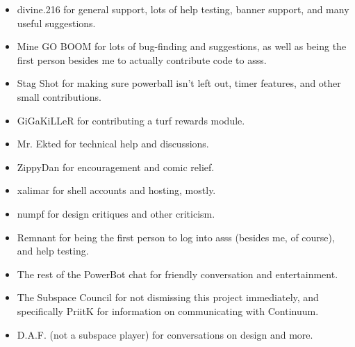 \documentclass{article}
\newcommand{\asss}{asss}
\begin{document}
\begin{itemize}

\item{divine.216} for general support, lots of help testing, banner
support, and many useful suggestions.

\item{Mine GO BOOM} for lots of bug-finding and suggestions, as well as
being the first person besides me to actually contribute code to
\asss{}.

\item{Stag Shot} for making sure powerball isn't left out, timer
features, and other small contributions.

\item{GiGaKiLLeR} for contributing a turf rewards module.

\item{Mr. Ekted} for technical help and discussions.

\item{ZippyDan} for encouragement and comic relief.

\item{xalimar} for shell accounts and hosting, mostly.

\item{numpf} for design critiques and other criticism.

\item{Remnant} for being the first person to log into \asss{} (besides
me, of course), and help testing.

\item{The rest of the PowerBot chat} for friendly conversation and
entertainment.

\item{The Subspace Council} for not dismissing this project immediately,
and specifically PriitK for information on communicating with Continuum.


\item{D.A.F. (not a subspace player)} for conversations on design and
more.

\end{itemize}
\end{document}
